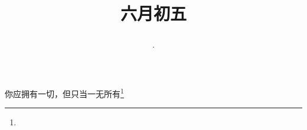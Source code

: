 \title{\date[d=10,m=7,y=2024][year:cn-y,年,month:cn,day:cn,日,·,weekday]·六月初五 }
你应拥有一切，但只当一无所有\footnote{ }

